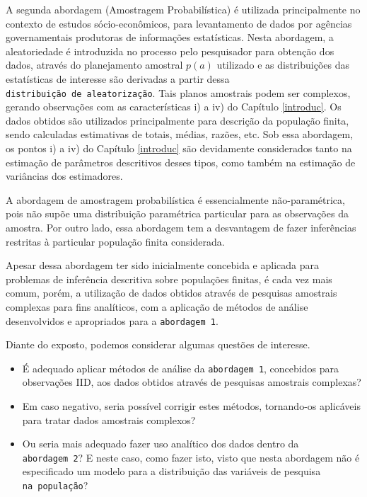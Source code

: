\documentclass[]{book}
\theoremstyle{definition}
\theoremstyle{definition}
\theoremstyle{definition}
\theoremstyle{remark}
\begin{document}
A segunda abordagem (Amostragem Probabilística) é utilizada
principalmente no contexto de estudos sócio-econômicos, para
levantamento de dados por agências governamentais produtoras de
informações estatísticas. Nesta abordagem, a aleatoriedade é introduzida
no processo pelo pesquisador para obtenção dos dados, através do
planejamento amostral \(p(a)\) utilizado \citep{Neyman} e as
distribuições das estatísticas de interesse são derivadas a partir dessa
\texttt{distribuição\ de\ aleatorização}. Tais planos amostrais podem
ser complexos, gerando observações com as características i) a iv) do
Capítulo \ref{introduc}. Os dados obtidos são utilizados principalmente
para descrição da população finita, sendo calculadas estimativas de
totais, médias, razões, etc. Sob essa abordagem, os pontos i) a iv) do
Capítulo \ref{introduc} são devidamente considerados tanto na estimação
de parâmetros descritivos desses tipos, como também na estimação de
variâncias dos estimadores.

A abordagem de amostragem probabilística é essencialmente
não-paramétrica, pois não supõe uma distribuição paramétrica particular
para as observações da amostra. Por outro lado, essa abordagem tem a
desvantagem de fazer inferências restritas à particular população finita
considerada.

Apesar dessa abordagem ter sido inicialmente concebida e aplicada para
problemas de inferência descritiva sobre populações finitas, é cada vez
mais comum, porém, a utilização de dados obtidos através de pesquisas
amostrais complexas para fins analíticos, com a aplicação de métodos de
análise desenvolvidos e apropriados para a \texttt{abordagem\ 1}.

Diante do exposto, podemos considerar algumas questões de interesse.

\begin{itemize}
\item
  É adequado aplicar métodos de análise da \texttt{abordagem\ 1},
  concebidos para observações IID, aos dados obtidos através de
  pesquisas amostrais complexas?
\item
  Em caso negativo, seria possível corrigir estes métodos, tornando-os
  aplicáveis para tratar dados amostrais complexos?
\item
  Ou seria mais adequado fazer uso analítico dos dados dentro da
  \texttt{abordagem\ 2}? E neste caso, como fazer isto, visto que nesta
  abordagem não é especificado um modelo para a distribuição das
  variáveis de pesquisa \texttt{na\ população}?
\end{itemize}
\end{document}
